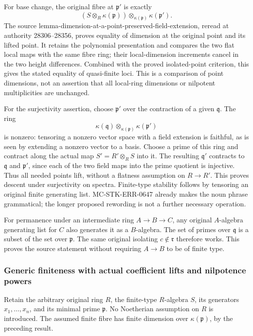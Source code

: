 For base change, the original fibre at \(\mathfrak p'\) is exactly \[
 (S\otimes_R\kappa(\mathfrak p))
       \otimes_{\kappa(\mathfrak p)}\kappa(\mathfrak p').
\] The source lemma-dimension-at-a-point-preserved-field-extension, reread at authority 28306--28356, proves equality of dimension at the original point and its lifted point. It retains the polynomial presentation and compares the two flat local maps with the same fibre ring; their local-dimension increments cancel in the two height differences. Combined with the proved isolated-point criterion, this gives the stated equality of quasi-finite loci. This is a comparison of point dimensions, not an assertion that all local-ring dimensions or nilpotent multiplicities are unchanged.

For the surjectivity assertion, choose \(\mathfrak p'\) over the contraction of a given \(\mathfrak q\). The ring \[
 \kappa(\mathfrak q)\otimes_{\kappa(\mathfrak p)}
       \kappa(\mathfrak p')
\] is nonzero: tensoring a nonzero vector space with a field extension is faithful, as is seen by extending a nonzero vector to a basis. Choose a prime of this ring and contract along the actual map \(S'=R'\otimes_RS\) into it. The resulting \(\mathfrak q'\) contracts to \(\mathfrak q\) and \(\mathfrak p'\), since each of the two field maps into the prime quotient is injective. Thus all needed points lift, without a flatness assumption on \(R\to R'\). This proves descent under surjectivity on spectra. Finite-type stability follows by tensoring an original finite generating list. MC-STK-ERR-0647 already makes the noun phrase grammatical; the longer proposed rewording is not a further necessary operation.

For permanence under an intermediate ring \(A\to B\to C\), any original \(A\)-algebra generating list for \(C\) also generates it as a \(B\)-algebra. The set of primes over \(\mathfrak q\) is a subset of the set over \(\mathfrak p\). The same original isolating \(c\notin\mathfrak r\) therefore works. This proves the source statement without requiring \(A\to B\) to be of finite type.

\subsubsection{Generic finiteness with actual coefficient lifts and nilpotence powers}\label{algebra-proof-031-generic-finiteness-with-actual-coefficient-lifts-and-nilpotence-powers}

Retain the arbitrary original ring \(R\), the finite-type \(R\)-algebra \(S\), its generators \(x_1,\ldots,x_n\), and its minimal prime \(\mathfrak p\). No Noetherian assumption on \(R\) is introduced. The assumed finite fibre has finite dimension over \(\kappa(\mathfrak p)\), by the preceding result.

